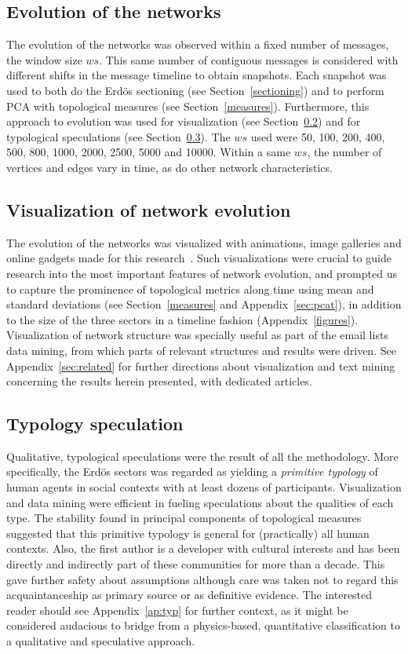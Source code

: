 \documentclass[%
 aip,
 jmp,%
 amsmath,amssymb,
 reprint,%
]{revtex4-1}
\begin{document}
\subsection{Evolution of the networks}
   The evolution of the networks was observed within a fixed number of messages, the window size $ws$. This same number of contiguous messages is considered with different shifts in the message timeline to obtain snapshots. Each snapshot was used to both do the Erd\"os sectioning (see Section~\ref{sectioning}) and to perform PCA with topological measures (see Section~\ref{measures}). Furthermore, this approach to evolution was used for visualization (see Section~\ref{sec:viz}) and for typological speculations (see Section~\ref{subsec:typ}).
The $ws$ used were 50, 100, 200, 400, 500, 800, 1000, 2000, 2500, 5000 and 10000. Within a same $ws$, the number of vertices and edges vary in time, as do other network characteristics.

\subsection{Visualization of network evolution}\label{sec:viz}
The evolution of the networks was visualized with animations, image galleries and online gadgets made for this research~\cite{animacoes,galGMANE,appGMANE}. Such visualizations were crucial to guide research into the most important features of network evolution, and prompted us to capture the prominence of topological metrics along time using mean and standard deviations (see Section~\ref{measures} and Appendix~\ref{sec:pcat}), in addition to the size of the three sectors in a timeline fashion (Appendix~\ref{figures}). Visualization of network structure was specially useful as part of the email lists data mining, from which parts of relevant structures and results were driven. See Appendix~\ref{sec:related} for further directions about visualization and text mining concerning the results herein presented, with dedicated articles.

\subsection{Typology speculation}\label{subsec:typ}
Qualitative, typological speculations were the result of all the methodology. More specifically, the Erd\"os sectors was regarded as yielding a \emph{primitive typology} of human agents in social contexts with at least dozens of participants. 
Visualization and data mining were efficient in fueling speculations about the qualities of each type. 
The stability found in principal components of topological measures suggested that this primitive typology is general for (practically) all human contexts.
Also, the first author is a developer with cultural interests and has been directly and indirectly part of these communities for more than a decade.  This gave further safety about assumptions although care was taken not to regard this acquaintanceship as primary source or as definitive evidence.
The interested reader should see Appendix~\ref{ap:typ} for further context, 
as it might be considered audacious to bridge from a physics-based, 
quantitative classification to a qualitative and speculative approach.
\end{document}
